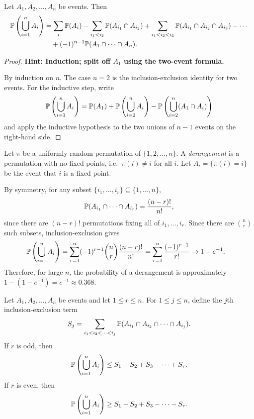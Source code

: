 \documentclass[a4paper]{article}
\begin{document}
\begin{thm}
  Let $A_1, A_2, \dotsc, A_n$ be events. Then
  \begin{align*}
    \P\left(\bigcup_{i=1}^n A_i\right) &= \sum_{i} \P(A_i) - \sum_{i_1 < i_2} \P(A_{i_1}\cap A_{i_2}) + \sum_{i_1 < i_2 < i_3}\P(A_{i_1}\cap A_{i_2} \cap A_{i_3}) - \cdots\\
    &\quad + (-1)^{n - 1} \P(A_1\cap \cdots \cap A_n).
  \end{align*}
\end{thm}

\begin{proof}
  \textbf{Hint: Induction; split off $A_1$ using the two-event formula.}

  By induction on $n$. The case $n = 2$ is the inclusion-exclusion identity for two events. For the inductive step, write
  \[
    \P\left(\bigcup_{i=1}^{n} A_i\right) = \P(A_1) + \P\left(\bigcup_{i = 2}^n A_i\right) - \P\left(\bigcup_{i = 2}^n (A_1\cap A_i)\right)
  \]
  and apply the inductive hypothesis to the two unions of $n-1$ events on the right-hand side.
\end{proof}

\begin{eg}[Derangements]
  Let $\pi$ be a uniformly random permutation of $\{1, 2, \dotsc, n\}$. A \emph{derangement} is a permutation with no fixed points, i.e.\ $\pi(i) \neq i$ for all $i$. Let $A_i = \{\pi(i) = i\}$ be the event that $i$ is a fixed point.

  By symmetry, for any subset $\{i_1, \dotsc, i_r\} \subseteq \{1, \dotsc, n\}$,
  \[
    \P(A_{i_1} \cap \cdots \cap A_{i_r}) = \frac{(n-r)!}{n!},
  \]
  since there are $(n-r)!$ permutations fixing all of $i_1, \dotsc, i_r$. Since there are $\binom{n}{r}$ such subsets, inclusion-exclusion gives
  \begin{align*}
    \P\left(\bigcup_{i = 1}^n A_i\right) &= \sum_{r=1}^{n} (-1)^{r-1} \binom{n}{r} \frac{(n-r)!}{n!} = \sum_{r=1}^{n} \frac{(-1)^{r-1}}{r!} \to 1 - e^{-1}.
  \end{align*}
  Therefore, for large $n$, the probability of a derangement is approximately $1 - (1 - e^{-1}) = e^{-1}\approx 0.368$.
\end{eg}

\begin{thm}
  Let $A_1, A_2, \dotsc, A_n$ be events and let $1 \leq r\leq n$. For $1 \leq j \leq n$, define the $j$th inclusion-exclusion term
  \[
    S_j = \sum_{i_1 < i_2 < \cdots < i_j} \P(A_{i_1}\cap A_{i_2}\cap \cdots \cap A_{i_j}).
  \]
  If $r$ is odd, then
  \[
    \P\left(\bigcup_{i=1}^n A_i\right) \leq S_1 - S_2 + S_3 - \cdots + S_r.
  \]
  If $r$ is even, then
  \[
    \P\left(\bigcup_{i=1}^n A_i\right) \geq S_1 - S_2 + S_3 - \cdots - S_r.
  \]
\end{thm}
\end{document}
